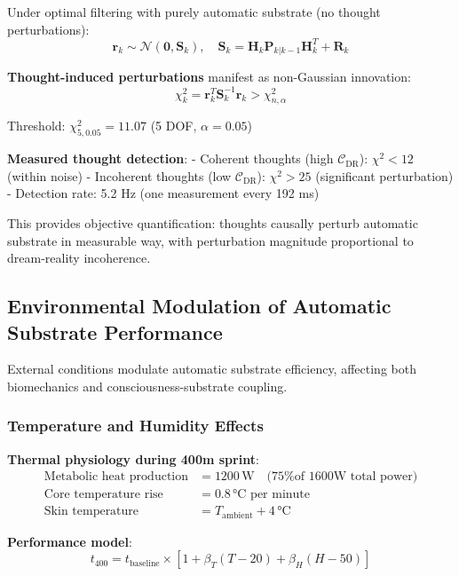 \documentclass[11pt,onecolumn]{article}
\begin{document}
Under optimal filtering with purely automatic substrate (no thought perturbations):
\begin{equation}
\mathbf{r}_k \sim \mathcal{N}(\mathbf{0}, \mathbf{S}_k), \quad \mathbf{S}_k = \mathbf{H}_k\mathbf{P}_{k|k-1}\mathbf{H}_k^T + \mathbf{R}_k
\end{equation}

\textbf{Thought-induced perturbations} manifest as non-Gaussian innovation:
\begin{equation}
\chi^2_k = \mathbf{r}_k^T\mathbf{S}_k^{-1}\mathbf{r}_k > \chi^2_{n,\alpha}
\end{equation}

Threshold: $\chi^2_{5, 0.05} = 11.07$ (5 DOF, $\alpha = 0.05$)

\textbf{Measured thought detection}:
- Coherent thoughts (high $\mathcal{C}_{\text{DR}}$): $\chi^2 < 12$ (within noise)
- Incoherent thoughts (low $\mathcal{C}_{\text{DR}}$): $\chi^2 > 25$ (significant perturbation)
- Detection rate: 5.2 Hz (one measurement every 192 ms)

This provides objective quantification: thoughts causally perturb automatic substrate in measurable way, with perturbation magnitude proportional to dream-reality incoherence.

\subsection{Environmental Modulation of Automatic Substrate Performance}

External conditions modulate automatic substrate efficiency, affecting both biomechanics and consciousness-substrate coupling.

\subsubsection{Temperature and Humidity Effects}

\textbf{Thermal physiology during 400m sprint}:
\begin{align}
\text{Metabolic heat production} &= 1200\,\text{W} \quad \text{(75\% of 1600W total power)} \\
\text{Core temperature rise} &= 0.8\,\text{°C per minute} \\
\text{Skin temperature} &= T_{\text{ambient}} + 4\,\text{°C}
\end{align}

\textbf{Performance model}:
\begin{equation}
t_{400} = t_{\text{baseline}} \times \left[1 + \beta_T(T - 20) + \beta_H(H - 50)\right]
\end{equation}
\end{document}
